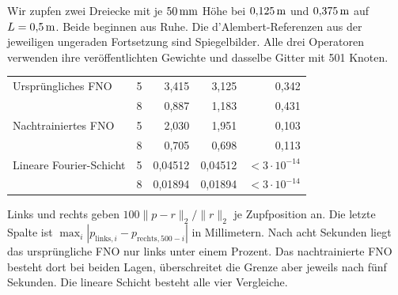 Wir zupfen zwei Dreiecke mit je \(50\,\mathrm{mm}\) Höhe bei \(0{,}125\,\mathrm{m}\) und \(0{,}375\,\mathrm{m}\) auf \(L=0{,}5\,\mathrm{m}\). Beide beginnen aus Ruhe. Die d’Alembert-Referenzen aus der jeweiligen ungeraden Fortsetzung sind Spiegelbilder. Alle drei Operatoren verwenden ihre veröffentlichten Gewichte und dasselbe Gitter mit 501 Knoten.
{\tblstart\begin{tabularx}{\linewidth}{@{}Yrrrr@{}}\toprule
{}&&&&\\\midrule
Ursprüngliches FNO&5&3,415&3,125&0,342\\
&8&0,887&1,183&0,431\\
Nachtrainiertes FNO&5&2,030&1,951&0,103\\
&8&0,705&0,698&0,113\\
Lineare Fourier-Schicht&5&0,04512&0,04512&\(<3\cdot10^{-14}\)\\
&8&0,01894&0,01894&\(<3\cdot10^{-14}\)\\\bottomrule\end{tabularx}\par}
Links und rechts geben \(100\|p-r\|_2/\|r\|_2\) je Zupfposition an. Die letzte Spalte ist \(\max_i|p_{\mathrm{links},i}-p_{\mathrm{rechts},500-i}|\) in Millimetern. Nach acht Sekunden liegt das ursprüngliche FNO nur links unter einem Prozent. Das nachtrainierte FNO besteht dort bei beiden Lagen, überschreitet die Grenze aber jeweils nach fünf Sekunden. Die lineare Schicht besteht alle vier Vergleiche.


